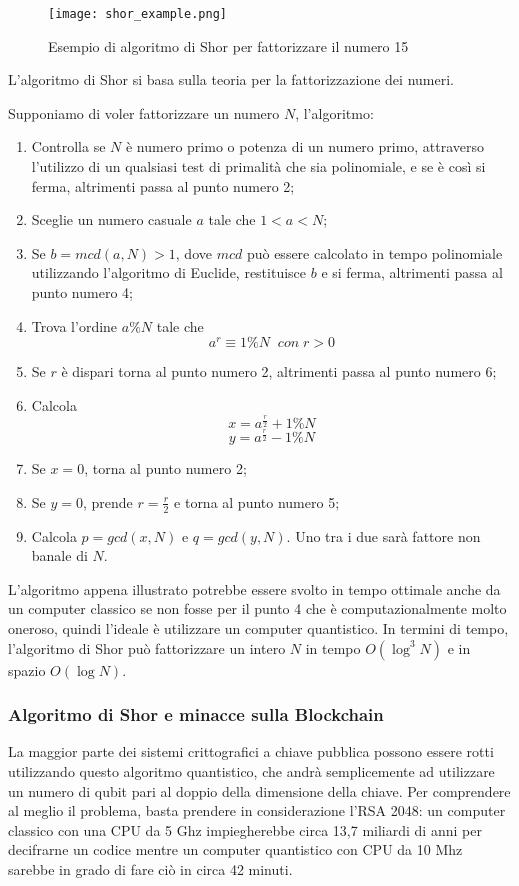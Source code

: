 \begin{figure}[h]
  \centering
  \texttt{[image: shor\_example.png]}
  \caption{Esempio di algoritmo di Shor per fattorizzare il numero 15}
  \label{fig:shor_example}
\end{figure}

L'algoritmo di Shor si basa sulla teoria per la fattorizzazione dei numeri.

Supponiamo di voler fattorizzare un numero \(N\), l'algoritmo:

\begin{enumerate}
  \item Controlla se \(N\) è numero primo o potenza di un numero primo, attraverso l'utilizzo di un qualsiasi test di primalità che sia polinomiale, e se è così si ferma, altrimenti passa al punto numero 2;
  \item Sceglie un numero casuale \(a\) tale che \(1 < a < N\);
  \item Se \(b = mcd\left(a, N\right) > 1\), dove \(mcd\) può essere calcolato in tempo polinomiale utilizzando l'algoritmo di Euclide, restituisce \(b\) e si ferma, altrimenti passa al punto numero 4;
  \item Trova l'ordine \(a \% N\) tale che
    \[
      a^r \equiv 1 \% N \;\; con \; r > 0
    \]
  \item Se \(r\) è dispari torna al punto numero 2, altrimenti passa al punto numero 6;
  \item Calcola
  \[
    x = a^{\frac{r}{2}} + 1 \% N
  \]
  \[
    y = a^{\frac{r}{2}} - 1 \% N
  \]
  \item Se \(x = 0\), torna al punto numero 2;
  \item Se \(y = 0\), prende \(r=\frac{r}{2}\) e torna al punto numero 5;
  \item Calcola \(p = gcd(x,N)\) e \(q = gcd(y,N)\). Uno tra i due sarà fattore non banale di \(N\).
\end{enumerate}

L'algoritmo appena illustrato potrebbe essere svolto in tempo ottimale anche da un computer classico se non fosse per il punto 4 che è computazionalmente molto oneroso, quindi l'ideale è utilizzare un computer quantistico. In termini di tempo, l'algoritmo di Shor può fattorizzare un intero \(N\) in tempo \(O(\log^3 N)\) e in spazio \(O(\log N)\).

\subsubsection{Algoritmo di Shor e minacce sulla Blockchain}
La maggior parte dei sistemi crittografici a chiave pubblica possono essere rotti utilizzando questo algoritmo quantistico, che andrà semplicemente ad utilizzare un numero di qubit pari al doppio della dimensione della chiave. Per comprendere al meglio il problema, basta prendere in considerazione l'RSA 2048: un computer classico con una CPU da 5 Ghz impiegherebbe circa 13,7 miliardi di anni per decifrarne un codice mentre un computer quantistico con CPU da 10 Mhz sarebbe in grado di fare ciò in circa 42 minuti\cite{kearney2021vulnerability}.

